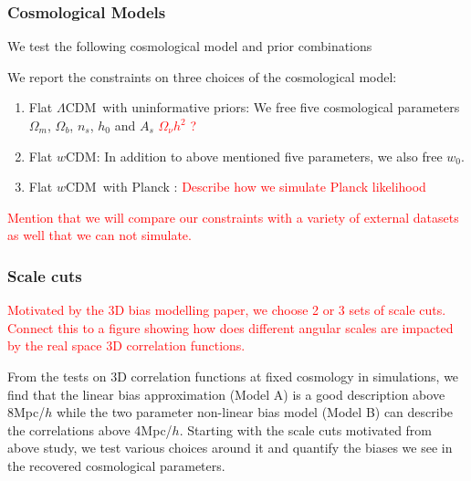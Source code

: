 \documentclass[fleqn,usenatbib]{mnras}
\newcommand{\lcdm}{$\Lambda$CDM}
\newcommand{\wcdm}{$w$CDM}
\newcommand{\red}[1]{\textcolor{red}{#1}}
\begin{document}
\subsubsection{Cosmological Models}

We test the following cosmological model and prior combinations




We report the constraints on three choices of the cosmological model:
\begin{enumerate}
    \item Flat \lcdm\ with uninformative priors: We free five cosmological parameters $\Omega_m$, $\Omega_b$, $n_s$, $h_0$ and $A_s$ \red{$\Omega_\nu h^2$ ?}
    \item Flat \wcdm : In addition to above mentioned five parameters, we also free $w_0$.
    \item Flat \wcdm\ with Planck : \red{Describe how we simulate Planck likelihood }
\end{enumerate}

\red{Mention that we will compare our constraints with a variety of external datasets as well that we can not simulate.}

\subsubsection{Scale cuts}




\red{Motivated by the 3D bias modelling paper, we choose 2 or 3 sets of scale cuts. Connect this to a figure showing how does different angular scales are impacted by the real space 3D correlation functions.}

From the tests on 3D correlation functions at fixed cosmology in simulations, we find that the linear bias approximation (Model A) is a good description above 8Mpc/$h$ while the two parameter non-linear bias model (Model B) can describe the correlations above 4Mpc/$h$. Starting with the scale cuts motivated from above study, we test various choices around it and quantify the biases we see in the recovered cosmological parameters.
\end{document}
